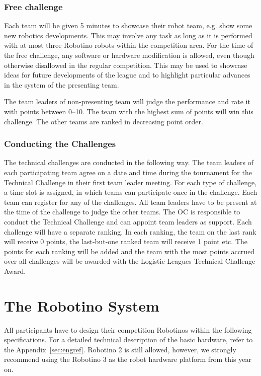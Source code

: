 \documentclass[12pt,twoside]{article}
\begin{document}
\subsubsection{Free challenge~}
Each team will be given 5 minutes to showcase their robot team, e.g.
show some new robotics developments. This may involve any task as long
as it is performed with at most three Robotino robots within the
competition area. For the time of the free challenge, any software or
hardware modification is allowed, even though otherwise disallowed in
the regular competition. This may be used to showcase ideas for future
developments of the league and to highlight particular advances in the
system of the presenting team.

The team leaders of non-presenting team will judge the performance and
rate it with points between 0--10.  The team with the highest sum of
points will win this challenge. The other teams are ranked in
decreasing point order.

\subsubsection{Conducting the Challenges~}
The technical challenges are conducted in the following way. The team
leaders of each participating team agree on a date and time during the
tournament for the Technical Challenge in their first team leader
meeting. For each type of challenge, a time slot is assigned, in which
teams can participate once in the challenge. Each team can register
for any of the challenges. All team leaders have to be present at the
time of the challenge to judge the other teams. The OC is responsible
to conduct the Technical Challenge and can appoint team leaders as
support. Each challenge will have a separate ranking. In each ranking,
the team on the last rank will receive 0 points, the last-but-one
ranked team will receive 1 point etc. The points for each ranking will
be added and the team with the most points accrued over all challenges
will be awarded with the Logistic Leagues Technical Challenge Award.


\section{The Robotino System}
\label{sec:robotino}

All participants have to design their competition Robotinos within the
following specifications. For a detailed technical description of the
basic hardware, refer to the Appendix~\ref{sec:engref}. Robotino 2 is
still allowed, however, we strongly recommend using the Robotino 3 as 
the robot hardware platform from this year on.
\end{document}
